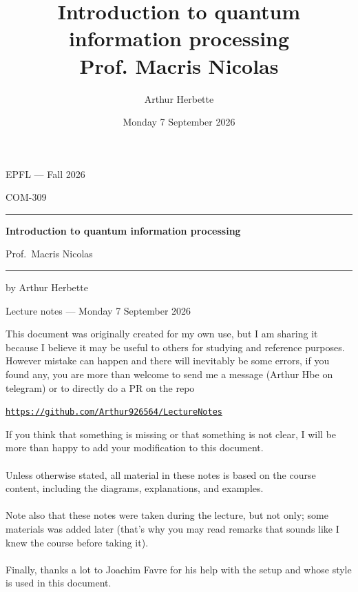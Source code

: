 \documentclass[a4paper, openany]{book}
\title{Introduction to quantum information processing \\ Prof. Macris Nicolas}
\author{Arthur Herbette}
\date{Monday 7 September 2026}
\begin{document}
\begin{titlepage}
    \centering
    \vspace*{2cm}
    
    {\large EPFL --- Fall 2026\par}
    \vspace{0.5cm}
    {\small COM-309\par}
    
    \vspace{2cm}
    \rule{\linewidth}{0.4pt}
    \vspace{0.4cm}
    
    {\huge\bfseries Introduction to quantum information processing\par}
    \vspace{0.3cm}
    {\large Prof.\ Macris Nicolas\par}
    
    \vspace{0.4cm}
    \rule{\linewidth}{0.4pt}
    
    \vfill
    
    {by Arthur Herbette\par}
    \vspace{0.3cm}
    {\small Lecture notes --- Monday 7 September 2026\par}
    
    \vspace{2cm}
\end{titlepage}
This document was originally created for my own use, but I am sharing it because I believe it may be useful to others for studying and reference purposes. However mistake can happen and there will inevitably be some errors, if you found any, you are more than welcome to send me a message (Arthur Hbe on telegram) or to directly do a PR on the repo 
\begin{center}
	\texttt{\href{https://github.com/Arthur926564/LectureNotes}{https://github.com/Arthur926564/LectureNotes}}
\end{center}

If you think that something is missing or that something is not clear, I will be more than happy to add your modification to this document.\\
$ $\\
Unless otherwise stated, all material in these notes is based on the course content, including the diagrams, explanations, and examples.\\
$ $\\
Note also that these notes were taken during the lecture, but not only; some materials was added later (that's why you may read remarks that sounds like I knew the course before taking it).\\
$ $\\
Finally, thanks a lot to Joachim Favre for his help with the setup and whose style is used in this document.
\end{document}
